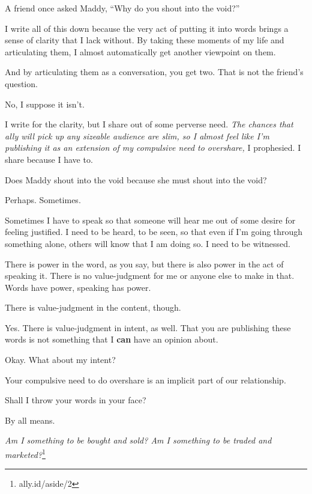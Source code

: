 \begin{paracol}{2}
\begin{leftcolumn}
\begin{ally}
A friend once asked Maddy, ``Why do you shout into the void?''
\end{ally}
I write all of this down because the very act of putting it into words brings a sense of clarity that I lack without. By taking these moments of my life and articulating them, I almost automatically get another viewpoint on them.

\begin{ally}
And by articulating them as a conversation, you get two. That is not the friend's question.
\end{ally}
No, I suppose it isn't.

I write for the clarity, but I share out of some perverse need. \emph{The chances that ally will pick up any sizeable audience are slim, so I almost feel like I'm publishing it as an extension of my compulsive need to overshare,} I prophesied. I share because I have to.

\begin{ally}
Does Maddy shout into the void because she must shout into the void?
\end{ally}
Perhaps. Sometimes.

Sometimes I have to speak so that someone will hear me out of some desire for feeling justified. I need to be heard, to be seen, so that even if I'm going through something alone, others will know that I am doing so. I need to be witnessed.

\begin{ally}
There is power in the word, as you say, but there is also power in the act of speaking it. There is no value-judgment for me or anyone else to make in that. Words have power, speaking has power.
\end{ally}
There is value-judgment in the content, though.

\begin{ally}
Yes. There is value-judgment in intent, as well. That you are publishing these words is not something that I \textbf{can} have an opinion about.
\end{ally}
Okay. What about my intent?

\begin{ally}
Your compulsive need to do overshare is an implicit part of our relationship.
\end{ally}
Shall I throw your words in your face?

\begin{ally}
By all means.
\end{ally}
\emph{Am I something to be bought and sold? Am I something to be traded and marketed?}\footnote{ally.id/aside/2}


\end{leftcolumn}
\end{paracol}
